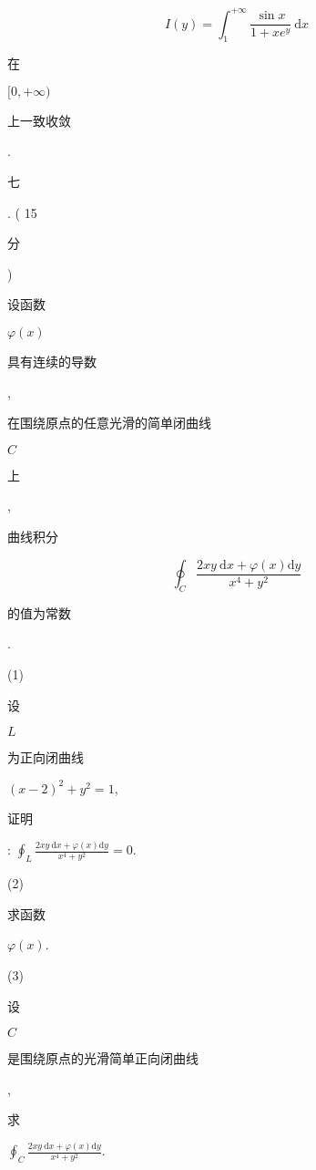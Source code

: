 \documentclass[10pt]{article}
\begin{document}
$$
I(y)=\int_{1}^{+\infty} \frac{\sin x}{1+x e^{y}} \mathrm{~d} x
$$
\begin{CJK}{UTF8}{mj}在\end{CJK} $[0,+\infty)$ \begin{CJK}{UTF8}{mj}上一致收敛\end{CJK}. \begin{CJK}{UTF8}{mj}七\end{CJK}. ( 15 \begin{CJK}{UTF8}{mj}分\end{CJK}) \begin{CJK}{UTF8}{mj}设函数\end{CJK} $\varphi(x)$ \begin{CJK}{UTF8}{mj}具有连续的导数\end{CJK}, \begin{CJK}{UTF8}{mj}在围绕原点的任意光滑的简单闭曲线\end{CJK} $C$ \begin{CJK}{UTF8}{mj}上\end{CJK}, \begin{CJK}{UTF8}{mj}曲线积分\end{CJK}
$$
\oint_{C} \frac{2 x y \mathrm{~d} x+\varphi(x) \mathrm{d} y}{x^{4}+y^{2}}
$$
\begin{CJK}{UTF8}{mj}的值为常数\end{CJK}.

(1) \begin{CJK}{UTF8}{mj}设\end{CJK} $L$ \begin{CJK}{UTF8}{mj}为正向闭曲线\end{CJK} $(x-2)^{2}+y^{2}=1$, \begin{CJK}{UTF8}{mj}证明\end{CJK}: $\oint_{L} \frac{2 x y \mathrm{~d} x+\varphi(x) \mathrm{d} y}{x^{4}+y^{2}}=0$.

(2) \begin{CJK}{UTF8}{mj}求函数\end{CJK} $\varphi(x)$.

(3) \begin{CJK}{UTF8}{mj}设\end{CJK} $C$ \begin{CJK}{UTF8}{mj}是围绕原点的光滑简单正向闭曲线\end{CJK}, \begin{CJK}{UTF8}{mj}求\end{CJK} $\oint_{C} \frac{2 x y \mathrm{~d} x+\varphi(x) \mathrm{d} y}{x^{4}+y^{2}}$.
\end{document}
